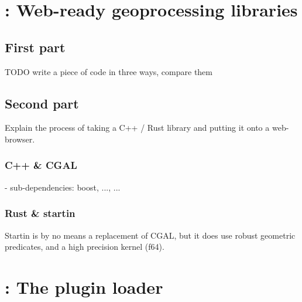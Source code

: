 \newpage

\section{\mySubRQTwoTitle: Web-ready geoprocessing libraries}
\label{sec:implementation:compilation}

\subsection{First part}

\begin{note}
TODO write a piece of code in three ways, compare them
\end{note} 

\subsection{Second part}

\begin{note}
Explain the process of taking a C++ / Rust library and putting it onto a web-browser.
\end{note}


\subsubsection*{C++ \& CGAL}

\begin{note}
- sub-dependencies: boost, ..., ...
\end{note}
  
\subsubsection*{Rust \& startin}

\begin{note}
Startin is by no means a replacement of CGAL, 
but it does use robust geometric predicates, and a high precision kernel (f64).
\end{note}


\newpage

\section{\mySubRQThreeTitle: The plugin loader}
\label{sec:implementation:loading}

